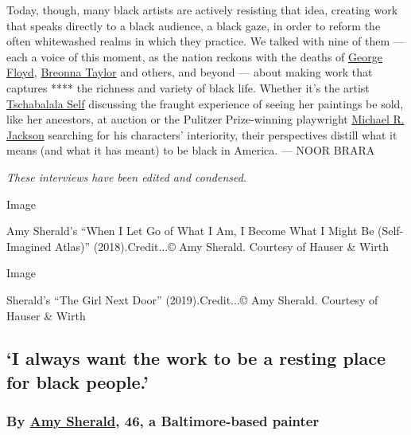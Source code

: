 Today, though, many black artists are actively resisting that idea,
creating work that speaks directly to a black audience, a black gaze, in
order to reform the often whitewashed realms in which they practice. We
talked with nine of them --- each a voice of this moment, as the nation
reckons with the deaths of
\href{https://www.nytimes3xbfgragh.onion/news-event/george-floyd-protests-minneapolis-new-york-los-angeles}{George
Floyd},
\href{https://www.nytimes3xbfgragh.onion/article/breonna-taylor-police.html}{Breonna
Taylor} and others, and beyond --- about making work that captures ****
the richness and variety of black life. Whether it's the artist
\href{https://www.nytimes3xbfgragh.onion/2019/05/31/t-magazine/tschabalala-self-artist-studio.html}{Tschabalala
Self} discussing the fraught experience of seeing her paintings be sold,
like her ancestors, at auction or the Pulitzer Prize-winning playwright
\href{https://www.nytimes3xbfgragh.onion/interactive/2019/04/10/t-magazine/virgil-abloh-michael-jackson.html}{Michael
R. Jackson} searching for his characters' interiority, their
perspectives distill what it means (and what it has meant) to be black
in America. --- NOOR BRARA

\emph{These interviews have been edited and condensed.}

Image

Amy Sherald's ``When I Let Go of What I Am, I Become What I Might Be
(Self-Imagined Atlas)'' (2018).Credit...© Amy Sherald. Courtesy of
Hauser \& Wirth

Image

Sherald's ``The Girl Next Door'' (2019).Credit...© Amy Sherald. Courtesy
of Hauser \& Wirth

\hypertarget{i-always-want-the-work-to-be-a-resting-place-for-black-people}{%
\subsection{`I always want the work to be a resting place for black
people.'}\label{i-always-want-the-work-to-be-a-resting-place-for-black-people}}

\hypertarget{by-amy-sherald-46-a-baltimore-based-painter}{%
\subsubsection{\texorpdfstring{\textbf{By}
\textbf{\href{http://www.amysherald.com/}{Amy Sherald}, 46, a
Baltimore-based
painter}}{By Amy Sherald, 46, a Baltimore-based painter}}\label{by-amy-sherald-46-a-baltimore-based-painter}}

